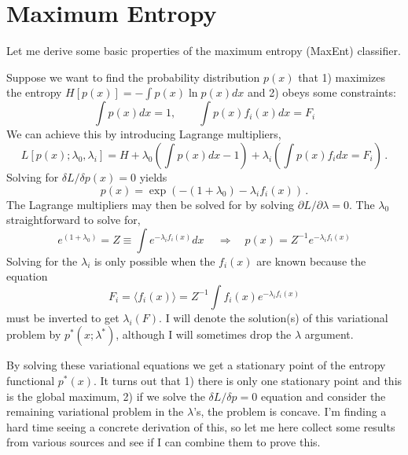 \documentclass[a4paper,12pt]{article}
\begin{document}
\section{Maximum Entropy}
Let me derive some basic properties of the maximum entropy (MaxEnt) classifier.

Suppose we want to find the probability distribution $p(x)$ that 1) maximizes the entropy $H[p(x)] = - \int p(x) \ln p(x) dx$ and 2) obeys some constraints:
\begin{equation}
\int p(x) dx = 1, \qquad \int p(x) f_i(x) dx = F_i
\end{equation}
We can achieve this by introducing Lagrange multipliers, 
\begin{equation}
L[p(x); \lambda_0, \lambda_i] = H + \lambda_0 \left( \int p(x) dx - 1 \right) + \lambda_i \left( \int p(x) f_i dx = F_i \right) \, . 
\end{equation}
Solving for $\delta L/\delta p(x) = 0$ yields
\begin{equation}
p(x) = \exp\left(-(1+\lambda_0)-\lambda_i f_i(x) \right) \, .
\end{equation}
The Lagrange multipliers may then be solved for by solving $\partial L/\partial \lambda = 0$. The $\lambda_0$ straightforward to solve for,
\begin{equation}
e^{(1+\lambda_0)} = Z \equiv \int e^{-\lambda_i f_i(x)} dx \, \quad \Rightarrow \quad p(x) = Z^{-1} e^{-\lambda_i f_i(x)}
\end{equation}
Solving for the $\lambda_i$ is only possible when the $f_i(x)$ are known because the equation
\begin{equation}
F_i = \langle f_i(x) \rangle = Z^{-1} \int f_i(x) e^{-\lambda_i f_i(x)}
\end{equation}
must be inverted to get $\lambda_i(F)$. I will denote the solution(s) of this variational problem by $p^*(x; \lambda^*)$, although I will sometimes drop the $\lambda$ argument.

By solving these variational equations we get a stationary point of the entropy functional $p^*(x)$. It turns out that 1) there is only one stationary point and this is the global maximum, 2) if we solve the $\delta L/\delta p=0$ equation and consider the remaining variational problem in the $\lambda$'s, the problem is concave. I'm finding a hard time seeing a concrete derivation of this, so let me here collect some results from various sources and see if I can combine them to prove this.
\end{document}

